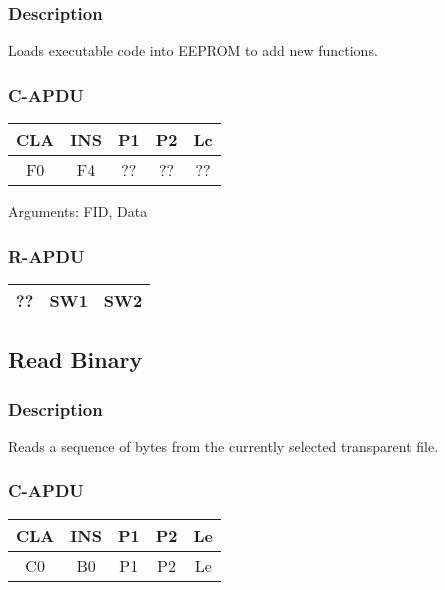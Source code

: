\documentclass[a4paper,oneside]{article}
\begin{document}
\subsubsection*{Description}

Loads executable code into EEPROM to add new functions.

\subsubsection*{C-APDU}

\begin{tabular}{|c|c|c|c|c|} \hline
CLA & INS & P1 & P2 & Lc \\ \hline \hline
F0 & F4 & ?? & ?? & ?? \\ \hline
\end{tabular}

Arguments: FID, Data

\subsubsection*{R-APDU}

\begin{tabular}{|c|c|c|} \hline
?? & SW1 & SW2 \\ \hline
\end{tabular}


\subsection{Read Binary}

\subsubsection*{Description}

Reads a sequence of bytes from the currently selected transparent file.

\subsubsection*{C-APDU}

\begin{tabular}{|c|c|c|c|c|} \hline
CLA & INS & P1 & P2 & Le \\ \hline \hline
C0 & B0 & P1 & P2 & Le \\ \hline
\end{tabular}
\end{document}
